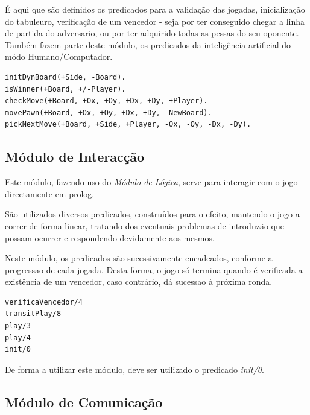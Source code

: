 \documentclass[15pt,a4paper]{article}
\begin{document}
É aqui que são definidos os predicados para a validação das jogadas, inicialização do tabuleuro, verificação de um vencedor - seja por ter conseguido chegar a linha de partida do adversario, ou por ter adquirido todas as pessas do seu oponente. Também fazem parte deste módulo, os predicados da inteligência artificial do módo Humano/Computador.


\begin{lstlisting}
initDynBoard(+Side, -Board).
isWinner(+Board, +/-Player).
checkMove(+Board, +Ox, +Oy, +Dx, +Dy, +Player).
movePawn(+Board, +Ox, +Oy, +Dx, +Dy, -NewBoard).
pickNextMove(+Board, +Side, +Player, -Ox, -Oy, -Dx, -Dy).
\end{lstlisting}



\subsection{Módulo de Interacção}

Este módulo, fazendo uso do \textit{Módulo de Lógica}, serve para interagir com o jogo directamente em prolog.

São utilizados diversos predicados, construídos para o efeito, mantendo o jogo a correr de forma linear, tratando dos eventuais problemas de introduzão que possam ocurrer e respondendo devidamente aos mesmos.

Neste módulo, os predicados são sucessivamente encadeados, conforme a progressao de cada jogada. Desta forma, o jogo só termina quando é verificada a existência de um vencedor, caso contrário, dá sucessao à
próxima ronda.

\begin{lstlisting}
verificaVencedor/4
transitPlay/8
play/3
play/4
init/0
\end{lstlisting}

De forma a utilizar este módulo, deve ser utilizado o predicado \textit{init/0}.


\subsection{Módulo de Comunicação}
\end{document}
